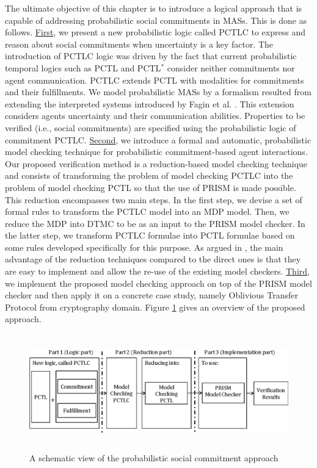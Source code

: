 The ultimate objective of this chapter is to introduce a logical approach that is capable of addressing probabilistic social commitments in MASs. This is done as follows. \underline{First}, we present a new probabilistic logic called PCTLC to express and reason about social commitments when uncertainty is a key factor. The introduction of PCTLC logic was driven by the fact that current probabilistic temporal logics such as PCTL \cite{Hansson1994} and PCTL$^*$ \cite{Baier1998} consider neither commitments nor agent communication. PCTLC extends PCTL with modalities for commitments and their fulfillments. We model probabilistic MASs by a formalism resulted from extending the  interpreted systems introduced by Fagin et al. \cite{Fagin1995}.
This extension considers agents uncertainty and their
communication abilities. Properties to be verified (i.e., social
commitments) are specified using the probabilistic logic of
commitment PCTLC. \underline{Second}, we introduce a formal and automatic, probabilistic model checking technique for probabilistic commitment-based agent interactions. Our proposed verification method is a reduction-based model checking technique and consists of transforming the problem of model
checking PCTLC into the problem of model checking PCTL \cite{Hansson1994} so that the use of PRISM is made possible. This reduction encompasses two main steps. In the first step, we devise a set of formal rules to transform the PCTLC model into an MDP model. Then, we reduce the MDP into DTMC to be as an input to the PRISM model checker. In the latter step, we transform PCTLC formulae into PCTL formulae based on some rules developed specifically for this purpose.
As argued in \cite{El-Menshawy2013a}, the main advantage of the reduction techniques compared to the direct ones is that they are easy to implement and allow the re-use of the existing model checkers. \underline{Third}, we implement the proposed model checking approach on top of the PRISM model checker and then apply it on a concrete case study, namely Oblivious Transfer Protocol \cite{Rivest1999} from cryptography domain. Figure \ref{approach-cha3} gives an overview of the proposed approach.



\begin{figure}%
\begin{center}
\includegraphics [width=14cm, height=5cm]{chap3/img/approach-cha3.eps}
  \caption{A schematic view of the probabilistic social commitment approach}
\label{approach-cha3}
\end{center}
\end{figure}


